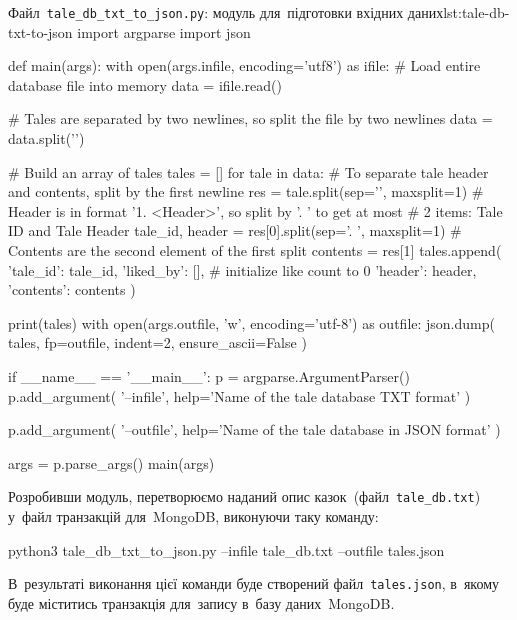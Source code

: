 \documentclass[
	a4paper,
	oneside,
	BCOR = 10mm,
	DIV = 12,
	12pt,
	headings = normal,
]{scrartcl}
\newcommand{\filename}[1]{\texttt{#1}}
\begin{document}
				\begin{listingpython}{Файл~\filename{\textenglish{tale\_db\_txt\_to\_json.py}}: модуль для~підготовки вхідних даних}{lst:tale-db-txt-to-json}
import argparse
import json


def main(args):
    with open(args.infile, encoding='utf8') as ifile:
        # Load entire database file into memory
        data = ifile.read()

    # Tales are separated by two newlines, so split the file by two newlines
    data = data.split('\n\n')

    # Build an array of tales
    tales = []
    for tale in data:
        # To separate tale header and contents, split by the first newline
        res = tale.split(sep='\n', maxsplit=1)
        # Header is in format '1. <Header>', so split by '. ' to get at most
        # 2 items: Tale ID and Tale Header
        tale_id, header = res[0].split(sep='. ', maxsplit=1)
        # Contents are the second element of the first split
        contents = res[1]
        tales.append(
            {
                'tale_id': tale_id,
                'liked_by': [],  # initialize like count to 0
                'header': header,
                'contents': contents
            }
        )

    print(tales)
    with open(args.outfile, 'w', encoding='utf-8') as outfile:
        json.dump(
            tales,
            fp=outfile,
            indent=2,
            ensure_ascii=False
        )


if __name__ == '__main__':
    p = argparse.ArgumentParser()
    p.add_argument(
        '--infile',
        help='Name of the tale database TXT format'
    )

    p.add_argument(
        '--outfile',
        help='Name of the tale database in JSON format'
    )

    args = p.parse_args()
    main(args)
				\end{listingpython}

				Розробивши модуль, перетворюємо наданий опис казок~(файл~\filename{tale\_db.txt}) у~файл транзакцій для~\textenglish{MongoDB}, виконуючи таку команду:
				\begin{bashterm}
					python3 tale_db_txt_to_json.py --infile tale_db.txt --outfile tales.json
				\end{bashterm}
				В~результаті виконання цієї команди буде створений файл~\filename{\textenglish{tales.json}}, в~якому буде міститись транзакція для~запису в~базу даних~\textenglish{MongoDB}.
\end{document}
